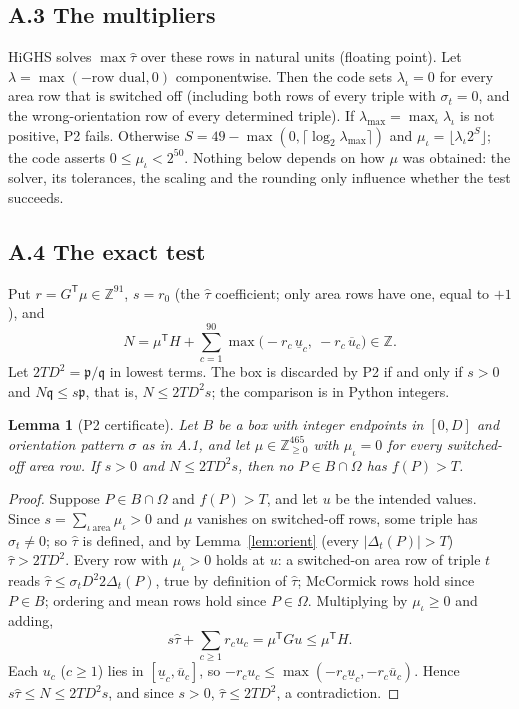 \documentclass[11pt]{amsart}
\newtheorem{lemma}[theorem]{Lemma}
\theoremstyle{definition}
\begin{document}
\subsection*{A.3 The multipliers}
HiGHS solves $\max \hat\tau$ over these rows in natural units (floating point). Let $\lambda = \max(-\text{row dual}, 0)$ componentwise. Then the code sets $\lambda_\iota = 0$ for every area row that is switched off (including both rows of every triple with $\sigma_t = 0$, and the wrong-orientation row of every determined triple). If $\lambda_{\max} = \max_\iota\lambda_\iota$ is not positive, P2 fails. Otherwise $S = 49 - \max(0, \lceil\log_2\lambda_{\max}\rceil)$ and $\mu_\iota = \lfloor \lambda_\iota 2^S\rfloor$; the code asserts $0 \le \mu_\iota < 2^{50}$. Nothing below depends on how $\mu$ was obtained: the solver, its tolerances, the scaling and the rounding only influence whether the test succeeds.

\subsection*{A.4 The exact test}
Put $r = G^{\mathsf T}\mu \in \mathbb{Z}^{91}$, $s = r_0$ (the $\hat\tau$ coefficient; only area rows have one, equal to $+1$), and
\[
 N = \mu^{\mathsf T} H + \sum_{c=1}^{90} \max\bigl(-r_c\,\underline u_c,\ -r_c\,\overline u_c\bigr) \in \mathbb{Z}.
\]
Let $2TD^2 = \mathfrak p/\mathfrak q$ in lowest terms. The box is discarded by P2 if and only if $s > 0$ and $N\mathfrak q \le s\mathfrak p$, that is, $N \le 2TD^2 s$; the comparison is in Python integers.

\begin{lemma}[P2 certificate]\label{lem:farkas}
Let $B$ be a box with integer endpoints in $[0,D]$ and orientation pattern $\sigma$ as in A.1, and let $\mu \in \mathbb{Z}_{\ge0}^{465}$ with $\mu_\iota = 0$ for every switched-off area row. If $s > 0$ and $N \le 2TD^2 s$, then no $P \in B \cap \Omega$ has $f(P) > T$.
\end{lemma}
\begin{proof}
Suppose $P \in B\cap\Omega$ and $f(P) > T$, and let $u$ be the intended values. Since $s = \sum_{\iota\ \text{area}} \mu_\iota > 0$ and $\mu$ vanishes on switched-off rows, some triple has $\sigma_t \ne 0$; so $\hat\tau$ is defined, and by Lemma~\ref{lem:orient} (every $\lvert\Delta_t(P)\rvert > T$) $\hat\tau > 2TD^2$. Every row with $\mu_\iota > 0$ holds at $u$: a switched-on area row of triple $t$ reads $\hat\tau \le \sigma_t D^2 2\Delta_t(P)$, true by definition of $\hat\tau$; McCormick rows hold since $P \in B$; ordering and mean rows hold since $P \in \Omega$. Multiplying by $\mu_\iota \ge 0$ and adding,
\[
 s\hat\tau + \sum_{c \ge 1} r_c u_c = \mu^{\mathsf T} G u \le \mu^{\mathsf T} H .
\]
Each $u_c$ ($c \ge 1$) lies in $[\underline u_c, \overline u_c]$, so $-r_c u_c \le \max(-r_c\underline u_c, -r_c\overline u_c)$. Hence $s\hat\tau \le N \le 2TD^2 s$, and since $s > 0$, $\hat\tau \le 2TD^2$, a contradiction.
\end{proof}
\end{document}
